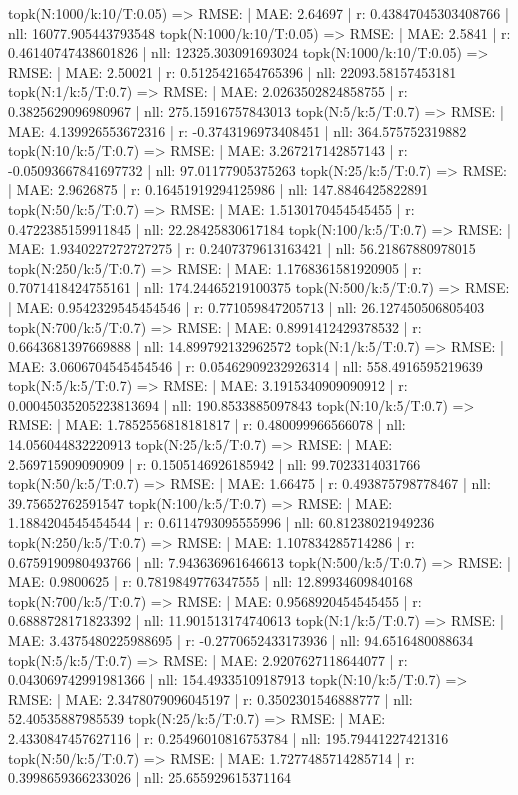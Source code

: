topk(N:1000/k:10/T:0.05) => RMSE: | MAE: 2.64697 | r: 0.43847045303408766 | nll: 16077.905443793548
topk(N:1000/k:10/T:0.05) => RMSE: | MAE: 2.5841 | r: 0.46140747438601826 | nll: 12325.303091693024
topk(N:1000/k:10/T:0.05) => RMSE: | MAE: 2.50021 | r: 0.5125421654765396 | nll: 22093.58157453181
topk(N:1/k:5/T:0.7) => RMSE: | MAE: 2.0263502824858755 | r: 0.3825629096980967 | nll: 275.15916757843013
topk(N:5/k:5/T:0.7) => RMSE: | MAE: 4.139926553672316 | r: -0.3743196973408451 | nll: 364.575752319882
topk(N:10/k:5/T:0.7) => RMSE: | MAE: 3.267217142857143 | r: -0.05093667841697732 | nll: 97.01177905375263
topk(N:25/k:5/T:0.7) => RMSE: | MAE: 2.9626875 | r: 0.16451919294125986 | nll: 147.8846425822891
topk(N:50/k:5/T:0.7) => RMSE: | MAE: 1.5130170454545455 | r: 0.4722385159911845 | nll: 22.28425830617184
topk(N:100/k:5/T:0.7) => RMSE: | MAE: 1.9340227272727275 | r: 0.2407379613163421 | nll: 56.21867880978015
topk(N:250/k:5/T:0.7) => RMSE: | MAE: 1.1768361581920905 | r: 0.7071418424755161 | nll: 174.24465219100375
topk(N:500/k:5/T:0.7) => RMSE: | MAE: 0.9542329545454546 | r: 0.771059847205713 | nll: 26.127450506805403
topk(N:700/k:5/T:0.7) => RMSE: | MAE: 0.8991412429378532 | r: 0.6643681397669888 | nll: 14.899792132962572
topk(N:1/k:5/T:0.7) => RMSE: | MAE: 3.0606704545454546 | r: 0.05462909232926314 | nll: 558.4916595219639
topk(N:5/k:5/T:0.7) => RMSE: | MAE: 3.1915340909090912 | r: 0.00045035205223813694 | nll: 190.8533885097843
topk(N:10/k:5/T:0.7) => RMSE: | MAE: 1.7852556818181817 | r: 0.480099966566078 | nll: 14.056044832220913
topk(N:25/k:5/T:0.7) => RMSE: | MAE: 2.569715909090909 | r: 0.1505146926185942 | nll: 99.7023314031766
topk(N:50/k:5/T:0.7) => RMSE: | MAE: 1.66475 | r: 0.493875798778467 | nll: 39.75652762591547
topk(N:100/k:5/T:0.7) => RMSE: | MAE: 1.1884204545454544 | r: 0.6114793095555996 | nll: 60.81238021949236
topk(N:250/k:5/T:0.7) => RMSE: | MAE: 1.107834285714286 | r: 0.6759190980493766 | nll: 7.943636961646613
topk(N:500/k:5/T:0.7) => RMSE: | MAE: 0.9800625 | r: 0.7819849776347555 | nll: 12.89934609840168
topk(N:700/k:5/T:0.7) => RMSE: | MAE: 0.9568920454545455 | r: 0.6888728171823392 | nll: 11.901513174740613
topk(N:1/k:5/T:0.7) => RMSE: | MAE: 3.4375480225988695 | r: -0.2770652433173936 | nll: 94.6516480088634
topk(N:5/k:5/T:0.7) => RMSE: | MAE: 2.9207627118644077 | r: 0.043069742991981366 | nll: 154.49335109187913
topk(N:10/k:5/T:0.7) => RMSE: | MAE: 2.3478079096045197 | r: 0.3502301546888777 | nll: 52.40535887985539
topk(N:25/k:5/T:0.7) => RMSE: | MAE: 2.4330847457627116 | r: 0.25496010816753784 | nll: 195.79441227421316
topk(N:50/k:5/T:0.7) => RMSE: | MAE: 1.7277485714285714 | r: 0.3998659366233026 | nll: 25.655929615371164
